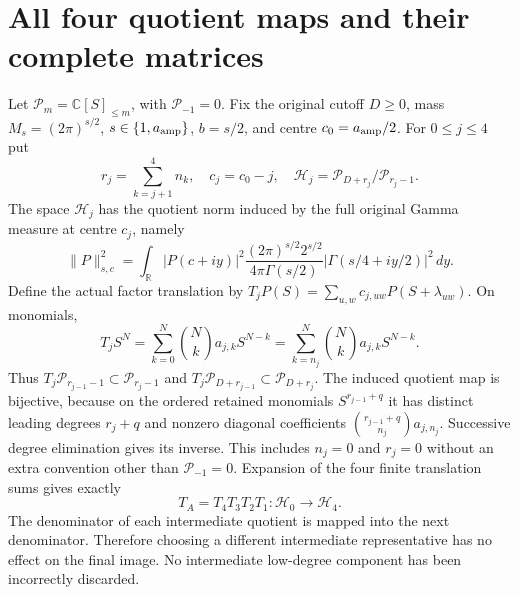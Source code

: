 \documentclass[11pt]{article}
\newcommand{\C}{\mathbb C}
\newcommand{\R}{\mathbb R}
\begin{document}
\section{All four quotient maps and their complete matrices}
Let $\mathcal P_m=\C[S]_{\le m}$, with $\mathcal P_{-1}=0$.
Fix the original cutoff $D\ge0$, mass $M_s=(2\pi)^{s/2}$,
$s\in\{1,a_{\rm amp}\}$, $b=s/2$, and centre $c_0=a_{\rm amp}/2$.
For $0\le j\le4$ put
\[
 r_j=\sum_{k=j+1}^4n_k,\quad c_j=c_0-j,\quad
 \mathcal H_j=\mathcal P_{D+r_j}/\mathcal P_{r_j-1}.
 \tag{IR14}
\]
The space $\mathcal H_j$ has the quotient norm induced by the full
original Gamma measure at centre $c_j$, namely
\[
 \|P\|_{s,c}^2=\int_{\R}|P(c+iy)|^2
 \frac{(2\pi)^{s/2}2^{s/2}}{4\pi\Gamma(s/2)}
 |\Gamma(s/4+iy/2)|^2\,dy.
 \tag{IR15}
\]
Define the actual factor translation by
$T_jP(S)=\sum_{u,w}c_{j,uw}P(S+\lambda_{uw})$. On monomials,
\[
 T_jS^N=\sum_{k=0}^N\binom Nk a_{j,k}S^{N-k}
       =\sum_{k=n_j}^N\binom Nk a_{j,k}S^{N-k}.
 \tag{IR16}
\]
Thus $T_j\mathcal P_{r_{j-1}-1}\subset\mathcal P_{r_j-1}$
and $T_j\mathcal P_{D+r_{j-1}}\subset\mathcal P_{D+r_j}$.
The induced quotient map is bijective, because on the ordered retained
monomials $S^{r_{j-1}+q}$ it has distinct leading degrees $r_j+q$
and nonzero diagonal coefficients
$\binom{r_{j-1}+q}{n_j}a_{j,n_j}$. Successive degree elimination
gives its inverse. This includes $n_j=0$ and $r_j=0$ without
an extra convention other than $\mathcal P_{-1}=0$.
Expansion of the four finite translation sums gives exactly
\[
 T_A=T_4T_3T_2T_1:\mathcal H_0\longrightarrow\mathcal H_4.
 \tag{IR17}
\]
The denominator of each intermediate quotient is mapped into the
next denominator. Therefore choosing a different intermediate
representative has no effect on the final image. No intermediate
low-degree component has been incorrectly discarded.
\end{document}
